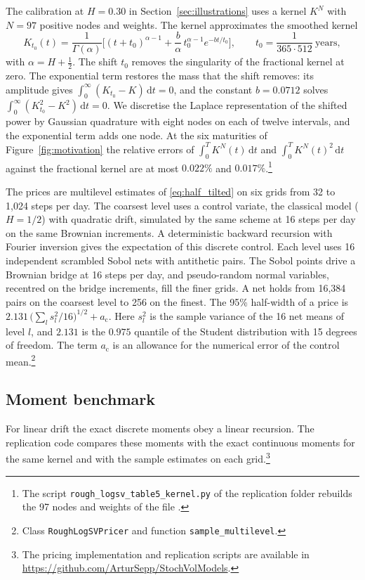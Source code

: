 \documentclass[11pt,a4paper]{article}
\theoremstyle{definition}
\newcommand{\D}{\mathrm{d}}
\begin{document}
The calibration at $H=0.30$ in Section~\ref{sec:illustrations} uses a kernel $K^N$ with $N=97$ positive nodes and weights. The kernel approximates the smoothed kernel
\begin{equation}\label{eq:kernel_smooth}
K_{t_0}(t)=\frac{1}{\Gamma(\alpha)}\Big[(t+t_0)^{\alpha-1}+\frac{b}{\alpha}\,t_0^{\alpha-1}e^{-bt/t_0}\Big],\qquad t_0=\frac{1}{365\cdot512}\ \text{years},
\end{equation}
with $\alpha=H+\tfrac12$. The shift $t_0$ removes the singularity of the fractional kernel at zero. The exponential term restores the mass that the shift removes: its amplitude gives $\int_0^\infty(K_{t_0}-K)\,\D t=0$, and the constant $b=0.0712$ solves $\int_0^\infty(K_{t_0}^2-K^2)\,\D t=0$. We discretise the Laplace representation of the shifted power by Gaussian quadrature with eight nodes on each of twelve intervals, and the exponential term adds one node. At the six maturities of Figure~\ref{fig:motivation} the relative errors of $\int_0^TK^N(t)\,\D t$ and $\int_0^TK^N(t)^2\,\D t$ against the fractional kernel are at most $0.022\%$ and $0.017\%$.\footnote{The script \texttt{rough\_logsv\_table5\_kernel.py} of the replication folder rebuilds the 97 nodes and weights of the file .}

The prices are multilevel estimates \citep{Giles2008} of \eqref{eq:half_tilted} on six grids from 32 to 1,024 steps per day. The coarsest level uses a control variate, the classical model ($H=1/2$) with quadratic drift, simulated by the same scheme at 16 steps per day on the same Brownian increments. A deterministic backward recursion with Fourier inversion gives the expectation of this discrete control. Each level uses 16 independent scrambled Sobol nets with antithetic pairs. The Sobol points drive a Brownian bridge at 16 steps per day, and pseudo-random normal variables, recentred on the bridge increments, fill the finer grids. A net holds from 16{,}384 pairs on the coarsest level to 256 on the finest. The 95\% half-width of a price is $2.131\,\big(\sum_ls_l^2/16\big)^{1/2}+a_{\mathrm c}$. Here $s_l^2$ is the sample variance of the 16 net means of level $l$, and $2.131$ is the $0.975$ quantile of the Student distribution with 15 degrees of freedom. The term $a_{\mathrm c}$ is an allowance for the numerical error of the control mean.\footnote{Class \texttt{RoughLogSVPricer} and function \texttt{sample\_multilevel}.}

\subsection{Moment benchmark}\label{sec:validation}
For linear drift the exact discrete moments obey a linear recursion. The replication code compares these moments with the exact continuous moments for the same kernel and with the sample estimates on each grid.\footnote{The pricing implementation and replication scripts are available in \url{https://github.com/ArturSepp/StochVolModels}.}
\end{document}
